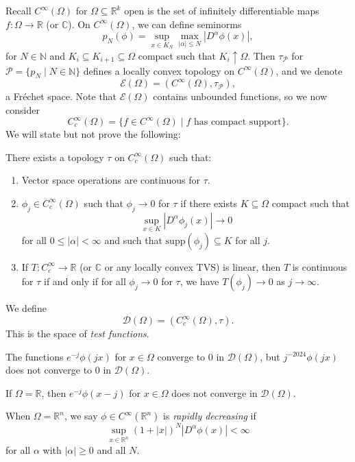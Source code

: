 \documentclass[12pt]{article}
\begin{document}
Recall $C^\infty(\Omega)$ for $\Omega \subseteq \mathbb{R}^k$ open is the set of infinitely differentiable maps $f : \Omega \to \mathbb{R}$ (or $\mathbb{C}$). On $C^\infty(\Omega)$, we can define seminorms
\[
p_N(\phi) = \sup_{x \in K_N} \max_{|\alpha| \leq N} |D^\alpha \phi(x)|,
\]
for $N \in \mathbb{N}$ and $K_i \subseteq K_{i+1} \subseteq \Omega$ compact such that $K_i \uparrow \Omega$. Then $\tau_\mathcal{P}$ for $\mathcal{P} = \{p_N \mid N \in \mathbb{N}\}$ defines a locally convex topology on $C^\infty(\Omega)$, and we denote
\[
\mathcal{E}(\Omega) = (C^\infty(\Omega), \tau_\mathcal{P}),
\]
a Fr\'echet space. Note that $\mathcal{E}(\Omega)$ contains unbounded functions, so we now consider
\[
	C_c^\infty(\Omega) = \{f \in C^\infty(\Omega) \mid f \text{ has compact support}\}.
\]
We will state but not prove the following:
\begin{theorem}
	There exists a topology $\tau$ on $C_c^\infty(\Omega)$ such that:
	\begin{enumerate}[\normalfont(i)]
		\item Vector space operations are continuous for $\tau$.
		\item $\phi_j \in C_c^\infty(\Omega)$ such that $\phi_j \to 0$ for $\tau$ if there exists $K \subseteq \Omega$ compact such that
			\[
			\sup_{x \in K} |D^\alpha \phi_j(x)| \to 0
			\]
			for all $0 \leq |\alpha| < \infty$ and such that $\mathrm{supp}(\phi_j) \subseteq K$ for all $j$.
		\item If $T : C_c^\infty \to \mathbb{R}$ (or $\mathbb{C}$ or any locally convex TVS) is linear, then $T$ is continuous for $\tau$ if and only if for all $\phi_j \to 0$ for $\tau$, we have $T(\phi_j) \to 0$ as $j \to \infty$.
	\end{enumerate}
\end{theorem}

We define
\[
\mathcal{D}(\Omega) = (C_c^\infty(\Omega), \tau).
\]
This is the space of \emph{test functions}.

\begin{exbox}
	The functions $e^{-j} \phi(jx)$ for $x \in \Omega$ converge to $0$ in $\mathcal{D}(\Omega)$, but $j^{-2024}\phi(jx)$ does not converge to $0$ in $\mathcal{D}(\Omega)$.

	If $\Omega = \mathbb{R}$, then $e^{-j} \phi(x - j)$ for $x \in \Omega$ does not converge in $\mathcal{D}(\Omega)$.
\end{exbox}

When $\Omega = \mathbb{R}^n$, we say $\phi \in C^\infty(\mathbb{R}^n)$ is \emph{rapidly decreasing} if
\[
\sup_{x \in \mathbb{R}^n}(1 + |x|)^N |D^\alpha \phi(x)| < \infty
\]
for all $\alpha$ with $|\alpha| \geq 0$ and all $N$.
\end{document}
